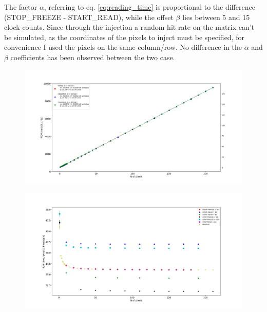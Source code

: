         The factor $\alpha$, referring to eq. \ref{eq:reading_time} is proportional to the difference (STOP\_FREEZE - START\_READ), while the offset $\beta$ lies between 5 and 15 clock counts.
        Since through the injection a random hit rate on the matrix can't be simulated, as the coordinates of the pixels to inject must be specified, for convenience I used the pixels on the same column/row. No difference in the $\alpha$ and $\beta$ coefficients has been observed between the two case. 
        \begin{figure}[h!]
            \centering
            \includegraphics[width=.9\linewidth]{figures/Monopix1/default_line.png}
            \caption{}
            \label{fig:dead_time}
        \end{figure}

        \begin{figure}[h!]
            \centering
            \includegraphics[width=.9\linewidth]{figures/Monopix1/parameters_points.png}
            \caption{}
            \label{fig:dead_time}
        \end{figure}        



